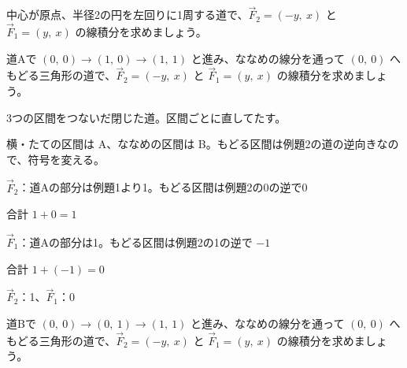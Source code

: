 \begin{jibun}
中心が原点、半径2の円を左回りに1周する道で、$\vec F_2=(-y,\ x)$ と $\vec F_1=(y,\ x)$ の線積分を求めましょう。
\end{jibun}

\begin{reidai}
道Aで $(0,\ 0)\to(1,\ 0)\to(1,\ 1)$ と進み、ななめの線分を通って $(0,\ 0)$ へもどる三角形の道で、$\vec F_2=(-y,\ x)$ と $\vec F_1=(y,\ x)$ の線積分を求めましょう。\par
\kangaekata {}\par
{}\enspace 3つの区間をつないだ閉じた道。区間ごとに直してたす。\par
{}\enspace 横・たての区間は A、ななめの区間は B。もどる区間は例題2の道の逆向きなので、符号を変える。\par
\shiki\kviiihs{}\zw{} $\vec F_2$：道Aの部分は例題1より1。もどる区間は例題2の0の逆で0\par
\kviiihb 合計 $1+0=1$\par
\kviiiha $\vec F_1$：道Aの部分は1。もどる区間は例題2の1の逆で $-1$\par
\kviiihb 合計 $1+(-1)=0$\par
\kotae $\vec F_2$：1、$\vec F_1$：0
\end{reidai}

\begin{jibun}
道Bで $(0,\ 0)\to(0,\ 1)\to(1,\ 1)$ と進み、ななめの線分を通って $(0,\ 0)$ へもどる三角形の道で、$\vec F_2=(-y,\ x)$ と $\vec F_1=(y,\ x)$ の線積分を求めましょう。
\end{jibun}

